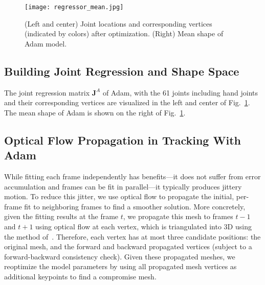 \documentclass[11pt,english]{article}
\begin{document}
\begin{figure}[t]
\centering
\texttt{[image: regressor\_mean.jpg]}
\caption{(Left and center) Joint locations and corresponding vertices (indicated by colors) after optimization. (Right) Mean shape of Adam model. }
\label{fig:jointregressor}
\end{figure}

\subsection{Building Joint Regression and Shape Space}
The joint regression matrix $\mathbf{J}^A$ of Adam, with the 61 joints including hand joints and their corresponding vertices are visualized in the left and center of  Fig.~\ref{fig:jointregressor}. The mean shape of Adam is shown on the right of Fig.~\ref{fig:jointregressor}.











\subsection{Optical Flow Propagation in Tracking With Adam}
While fitting each frame independently has benefits---it does not suffer from error accumulation and frames can be fit in parallel---it typically produces jittery motion. To reduce this jitter, we use optical flow to propagate the initial, per-frame fit to neighboring frames to find a smoother solution. More concretely, given the fitting results at the frame $t$, we propagate this mesh to  frames $t{-}1$ and $t{+}1$ using optical flow at each vertex, which is triangulated into 3D using the method of~\cite{Joo2014}. Therefore, each vertex has at most three candidate positions: the original mesh, and the forward and backward propagated vertices (subject to a forward-backward consistency check). Given these propagated meshes, we reoptimize the model parameters by using all propagated mesh vertices as additional keypoints to find a compromise mesh. 


{\small
	
	
}
\end{document}
